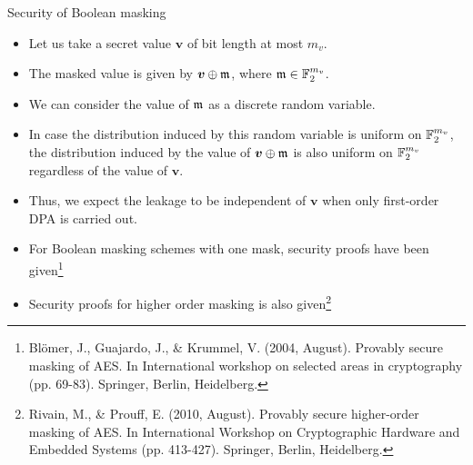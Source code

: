 \begin{frame}{Security of Boolean masking}
    \begin{itemize}
        \item Let us take a secret value $\boldsymbol{v}$ of bit length at most $m_v$.
       \item The masked value is given by $\boldsymbol{v}\oplus{\mathfrak m}$, where ${\mathfrak m}\in{\mathbb F}_2^{m_v}$.
      \item We can consider the value of ${\mathfrak m}$ as a discrete random variable.
       \item In case the distribution induced by this random variable is uniform on ${\mathbb F}_2^{m_v}$, the distribution induced by the value of $\boldsymbol{v}\oplus{\mathfrak m}$ is also uniform on ${\mathbb F}_2^{m_v}$ regardless of the value of $\boldsymbol{v}$.
       \item Thus, we expect the leakage to be independent of $\boldsymbol{v}$ when only first-order DPA is carried out.
       \item For Boolean masking schemes with one mask, security proofs have been given\footnote{Blömer, J., Guajardo, J., \& Krummel, V. (2004, August). Provably secure masking of AES. In International workshop on selected areas in cryptography (pp. 69-83). Springer, Berlin, Heidelberg.}
        \item Security proofs for higher order masking is also given\footnote{Rivain, M., \& Prouff, E. (2010, August). Provably secure higher-order masking of AES. In International Workshop on Cryptographic Hardware and Embedded Systems (pp. 413-427). Springer, Berlin, Heidelberg.}
    \end{itemize}
\end{frame}

